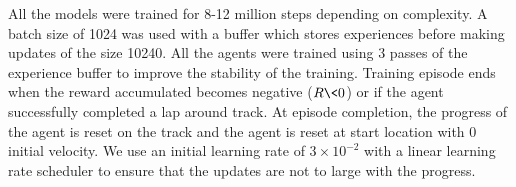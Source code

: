 All the models were trained for 8-12 million steps depending on complexity. A batch size of 1024 was used with a buffer which stores experiences before making updates of the size 10240. All the agents were trained using 3 passes of the experience buffer to improve the stability of the training. Training episode ends when the reward accumulated becomes negative ($R \< 0$) or if the agent successfully completed a lap around track. At episode completion, the progress of the agent is reset on the track and the agent is reset at start location with 0 initial velocity. We use an initial learning rate of $3 \times 10^{-2}$ with a linear learning rate scheduler to ensure that the updates are not to large with the progress.

